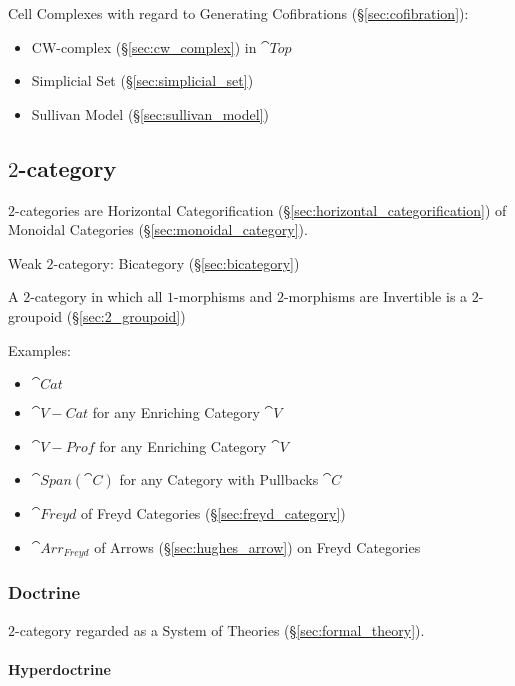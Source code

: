 Cell Complexes with regard to Generating Cofibrations
(\S\ref{sec:cofibration}):
\begin{itemize}
\item CW-complex (\S\ref{sec:cw_complex}) in $\cat{Top}$
\item Simplicial Set (\S\ref{sec:simplicial_set})
\item Sullivan Model (\S\ref{sec:sullivan_model})
\end{itemize}



\subsection{$2$-category}\label{sec:2_category}

$2$-categories are Horizontal Categorification
(\S\ref{sec:horizontal_categorification}) of Monoidal Categories
(\S\ref{sec:monoidal_category}).

Weak $2$-category: Bicategory (\S\ref{sec:bicategory})

A $2$-category in which all $1$-morphisms and $2$-morphisms are
Invertible is a $2$-groupoid (\S\ref{sec:2_groupoid})

Examples:
\begin{itemize}
\item $\cat{Cat}$
\item $\cat{V-Cat}$ for any Enriching Category $\cat{V}$
\item $\cat{V-Prof}$ for any Enriching Category $\cat{V}$
\item $\cat{Span}(\cat{C})$ for any Category with Pullbacks $\cat{C}$
\item $\cat{Freyd}$ of Freyd Categories (\S\ref{sec:freyd_category})
\item $\cat{Arr_{Freyd}}$ of Arrows (\S\ref{sec:hughes_arrow}) on
  Freyd Categories
\end{itemize}



\subsubsection{Doctrine}\label{sec:doctrine}

$2$-category regarded as a System of Theories
(\S\ref{sec:formal_theory}).



\paragraph{Hyperdoctrine}\label{sec:hyperdoctrine}
\hfill \\

